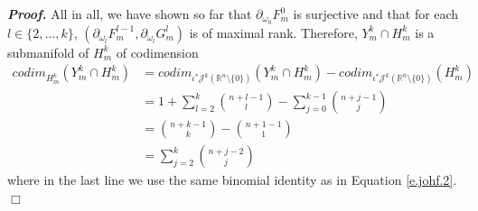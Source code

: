 \documentclass[10pt,twoside]{article}
\newcommand{\calJ}{\mathcal{J}}
\newcommand{\Rnzls}{\mathbb{R}^n\setminus\{0\}}
\newenvironment{prf}[1][]
{\vskip 2mm  {\it \bf Proof#1. }}{$\Box$ \vskip 2mm}
\numberwithin{theorem}{section}
\begin{document}
\begin{prf}
All in all, we have shown so far that $\partial_{\omega_0} F_m^0$ is surjective and that for each $l\in\{2,\dots,k\}$, $(\partial_{\omega_l}F_m^{l-1},\partial_{\omega_l}G_m^l)$ is of maximal rank. Therefore, $Y_m^k\cap H^k_m$ is a submanifold of $H^k_m$ of codimension
\begin{align*}
codim_{H^k_m}(Y^k_m\cap H^k_m)&=codim_{\iota^*\calJ^k\left(\Rnzls\right)}\left(Y^k_m\cap H^k_m\right)-codim_{\iota^*\calJ^k\left(\Rnzls\right)}\left(H^k_m\right)\\
&=1+\sum_{l=2}^k\binom{n+l-1}{l}-\sum_{j=0}^{k-1}\binom{n+j-1}{j}\\
&=\binom{n+k-1}{k}-\binom{n+1-1}{1}\\
&=\sum_{j=2}^k\binom{n+j-2}{j}
\end{align*}
where in the last line we use the same binomial identity as in Equation \eqref{e.johf.2}.
\end{prf}
\end{document}
